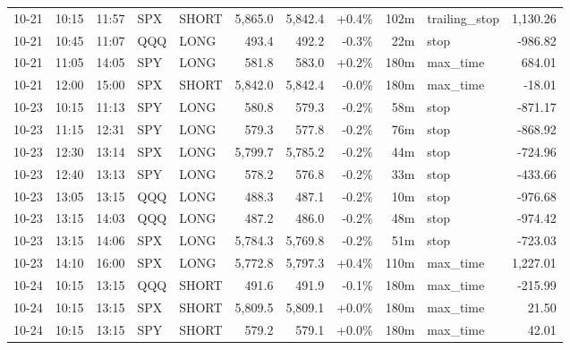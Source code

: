 \documentclass[11pt,a4paper,twoside]{article}
\begin{document}
\begin{center}
\begin{longtable}{>{\color{txtmain}}l l l l l r r r r >{\color{txtmain}}l r}
10-21 & 10:15 & 11:57 & SPX & SHORT & 5,865.0 & 5,842.4 & \textcolor{wingreen}{+0.4\%} & 102m & trailing\_stop & \textcolor{wingreen}{1,130.26} \\
10-21 & 10:45 & 11:07 & QQQ & LONG & 493.4 & 492.2 & \textcolor{lossred}{-0.3\%} & 22m & stop & \textcolor{lossred}{-986.82} \\
10-21 & 11:05 & 14:05 & SPY & LONG & 581.8 & 583.0 & \textcolor{wingreen}{+0.2\%} & 180m & max\_time & \textcolor{wingreen}{684.01} \\
10-21 & 12:00 & 15:00 & SPX & SHORT & 5,842.0 & 5,842.4 & \textcolor{lossred}{-0.0\%} & 180m & max\_time & \textcolor{lossred}{-18.01} \\
10-23 & 10:15 & 11:13 & SPY & LONG & 580.8 & 579.3 & \textcolor{lossred}{-0.2\%} & 58m & stop & \textcolor{lossred}{-871.17} \\
10-23 & 11:15 & 12:31 & SPY & LONG & 579.3 & 577.8 & \textcolor{lossred}{-0.2\%} & 76m & stop & \textcolor{lossred}{-868.92} \\
10-23 & 12:30 & 13:14 & SPX & LONG & 5,799.7 & 5,785.2 & \textcolor{lossred}{-0.2\%} & 44m & stop & \textcolor{lossred}{-724.96} \\
10-23 & 12:40 & 13:13 & SPY & LONG & 578.2 & 576.8 & \textcolor{lossred}{-0.2\%} & 33m & stop & \textcolor{lossred}{-433.66} \\
10-23 & 13:05 & 13:15 & QQQ & LONG & 488.3 & 487.1 & \textcolor{lossred}{-0.2\%} & 10m & stop & \textcolor{lossred}{-976.68} \\
10-23 & 13:15 & 14:03 & QQQ & LONG & 487.2 & 486.0 & \textcolor{lossred}{-0.2\%} & 48m & stop & \textcolor{lossred}{-974.42} \\
10-23 & 13:15 & 14:06 & SPX & LONG & 5,784.3 & 5,769.8 & \textcolor{lossred}{-0.2\%} & 51m & stop & \textcolor{lossred}{-723.03} \\
10-23 & 14:10 & 16:00 & SPX & LONG & 5,772.8 & 5,797.3 & \textcolor{wingreen}{+0.4\%} & 110m & max\_time & \textcolor{wingreen}{1,227.01} \\
10-24 & 10:15 & 13:15 & QQQ & SHORT & 491.6 & 491.9 & \textcolor{lossred}{-0.1\%} & 180m & max\_time & \textcolor{lossred}{-215.99} \\
10-24 & 10:15 & 13:15 & SPX & SHORT & 5,809.5 & 5,809.1 & \textcolor{wingreen}{+0.0\%} & 180m & max\_time & \textcolor{wingreen}{21.50} \\
10-24 & 10:15 & 13:15 & SPY & SHORT & 579.2 & 579.1 & \textcolor{wingreen}{+0.0\%} & 180m & max\_time & \textcolor{wingreen}{42.01} \\

\end{longtable}
\end{center}
\end{document}
